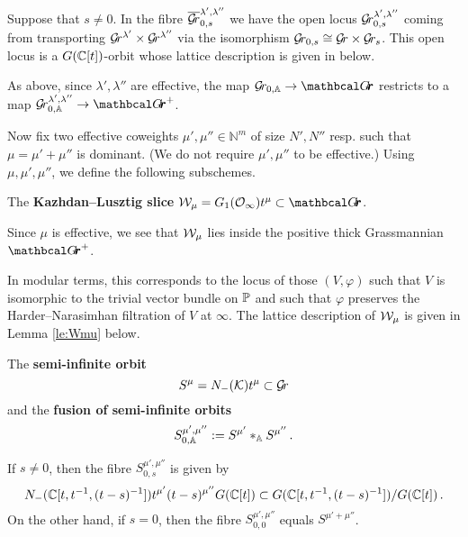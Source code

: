 \documentclass[draft]{article}
\begin{document}
    Suppose that $ s \ne 0$.  In the fibre $\overline{\Gr}_{0,s}^{\lambda', \lambda''}$ we have the open locus $ \Gr_{0,s}^{\lambda', \lambda''}$ coming from transporting $ \Gr^{\lambda'} \times \Gr^{\lambda''} $ via the isomorphism $ \Gr_{0,s} \cong \Gr \times \Gr_s $.  This open locus is a $ G(\CC[t])$-orbit
    whose lattice description is given in  below.
    
As above, since $ \lambda', \lambda'' $ are effective, the map $ \Gr_{0, \AA} \rightarrow \Grth$ restricts to a map $ \Gr^{\lambda', \lambda''}_{0, \AA} \rightarrow \Grth^+$.

Now fix two effective coweights $ \mu', \mu'' \in \mathbb N^m$ of size $N',N''$ resp. such that $ \mu = \mu' + \mu'' $ is dominant. (We do not require $ \mu', \mu'' $ to be effective.) 
Using $ \mu, \mu', \mu''$, we define the following subschemes.

\begin{definition}
    The \textbf{Kazhdan--Lusztig slice} $\cW_\mu = G_1(\Oinf) t^\mu \subset \Grth $.  
\end{definition}
Since $\mu $ is effective, we see that $ \cW_\mu $ lies inside the positive thick Grassmannian $ \Grth^+$.
    
    In modular terms, this corresponds to the locus of those $ (V, \varphi)$ such that $ V $ is isomorphic to the trivial vector bundle on $ \PP$ and such that $ \varphi$ preserves the {Harder--Narasimhan filtration of $V$ at $ \infty$}.  The lattice description of $ \cW_\mu $ is given in Lemma \ref{le:Wmu} below. 
\begin{definition} The \textbf{semi-infinite orbit} 
$$ S^\mu = N_-(\cK)t^\mu \subset \Gr $$ 
and the \textbf{fusion of  semi-infinite orbits} 
$$ S^{\mu', \mu''}_{0,\AA} := S^{\mu'} \ast_\AA S^{\mu''} \,.$$  
\end{definition}
If $ s \ne 0 $, then the fibre $S^{\mu', \mu''}_{0,s} $ is given by
    $$
    N_-(\CC[t, t^{-1}, (t-s)^{-1}])t^{\mu'} (t-s)^{\mu''} G(\CC[t])\subset G(\CC[t,t^{-1}, (t-s)^{-1}]) / G(\CC[t]) \,. %
    $$
    On the other hand, if $ s = 0$, then the fibre $S^{\mu', \mu''}_{0,0} $ equals $ S^{\mu' + \mu''}$. 
    
\end{document}
